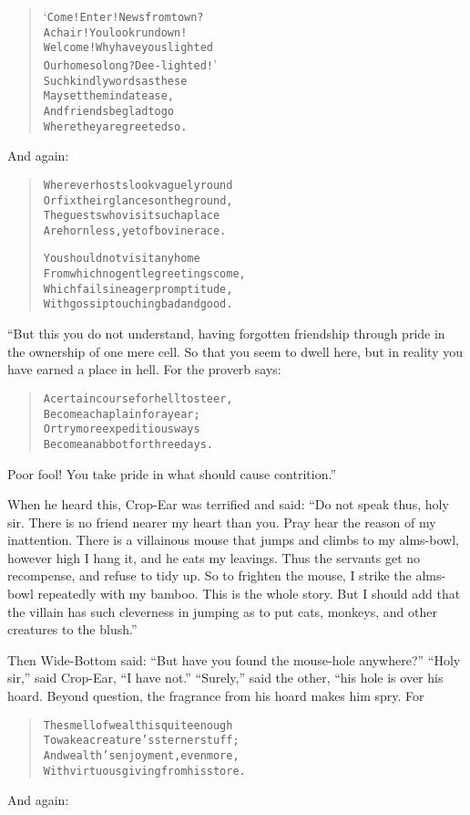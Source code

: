\documentclass[article, twoside, 14pt]{memoir}
\renewenvironment{verbatim}{%
\begin{quote}%
\vskip -10pt%
\begin{alltt}\normalfont\large}{\end{alltt}%
\end{quote}%
\vskip -10pt
} %
\begin{document}
\begin{verbatim}
‘Come! Enter! News from town?
A chair! You look run down!
Welcome! Why have you slighted
Our home so long? Dee-lighted!’
Such kindly words as these
May set the mind at ease,
And friends be glad to go
Where they are greeted so.
\end{verbatim}
And again:

\begin{verbatim}
Wherever hosts look vaguely round
Or fix their glances on the ground,
The guests who visit such a place
Are hornless, yet of bovine race.

You should not visit any home
From which no gentle greetings come,
Which fails in eager promptitude,
With gossip touching bad and good.
\end{verbatim}
“But this you do not understand, having forgotten friendship
through pride in the ownership of one mere cell. So that you seem
to dwell here, but in reality you have earned a place in hell. For
the proverb says:

\begin{verbatim}
A certain course for hell to steer,
Become a chaplain for a year;
Or try more expeditious ways{\textemdash}
Become an abbot for three days.
\end{verbatim}
Poor fool! You take pride in what should cause contrition.”

When he heard this, Crop-Ear was terrified and said:
``Do not speak thus, holy sir. There is no friend nearer my heart than you. Pray hear the reason of my inattention. There is a villainous mouse that jumps and climbs to my alms-bowl, however high I hang it, and he eats my leavings. Thus the servants get no recompense, and refuse to tidy up. So to frighten the mouse, I strike the alms-bowl repeatedly with my bamboo. This is the whole story. But I should add that the villain has such cleverness in jumping as to put cats, monkeys, and other creatures to the blush.''

Then Wide-Bottom said:
``But have you found the mouse-hole anywhere?'' ``Holy sir,'' said
Crop-Ear, ``I have not.'' ``Surely,'' said the other, “his hole is
over his hoard. Beyond question, the fragrance from his hoard makes
him spry. For

\begin{verbatim}
The smell of wealth is quite enough
To wake a creature's sterner stuff;
And wealth's enjoyment, even more,
With virtuous giving from his store.
\end{verbatim}
And again:
\end{document}

